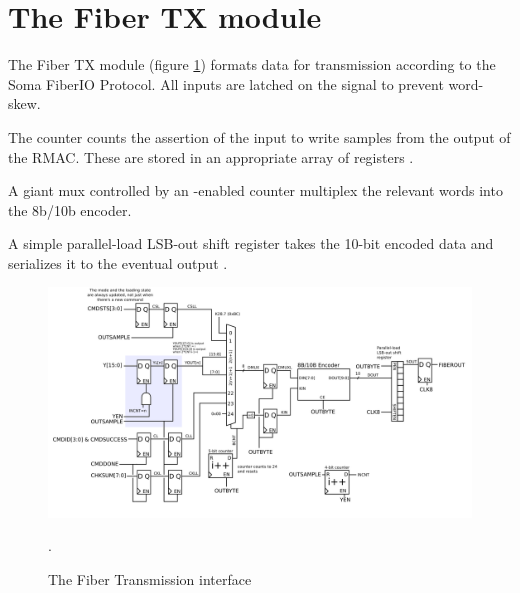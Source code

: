 \section{The Fiber TX module} 

The Fiber TX module (figure \ref{fibertx})  formats data for transmission according to the
Soma FiberIO Protocol. All inputs are latched on the
 signal to prevent word-skew.

The counter  counts the assertion of the input
 to write samples from the output of the RMAC. These are stored in an appropriate array of registers .

A giant mux controlled by an -enabled counter multiplex the relevant words into the 8b/10b encoder. 

A simple parallel-load LSB-out shift register takes the 10-bit encoded
data  and serializes it to the eventual output
.


\begin{figure}[h!]
\includegraphics[scale=1.0]{fiberTX.svg}
\label{fibertx}
\caption{The Fiber Transmission interface}. 
\end{figure}
